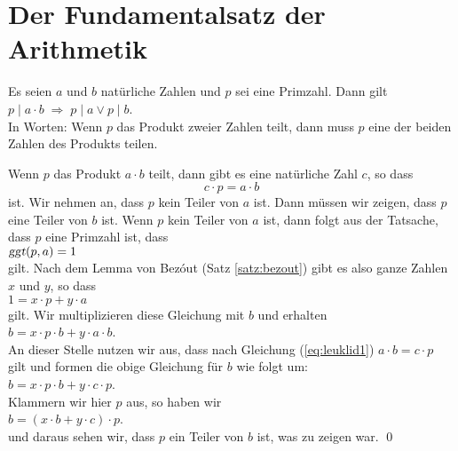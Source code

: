 \section{Der Fundamentalsatz der Arithmetik}
\begin{Satz} \lb
Es seien $a$ und $b$ natürliche Zahlen und $p$ sei eine Primzahl.  Dann gilt
\\[0.2cm]
\hspace*{1.3cm}
$p \mid a \cdot b \;\Rightarrow\; p \mid a  \vee p \mid b$.
\\[0.2cm]
In Worten: Wenn $p$ das Produkt zweier Zahlen teilt, dann muss $p$ eine der beiden Zahlen
des Produkts teilen.  
\end{Satz}

\proof
Wenn $p$ das Produkt $a \cdot b$ teilt, dann gibt es eine natürliche Zahl $c$, so dass
\begin{equation}
  \label{eq:leuklid1}
  c \cdot p = a \cdot b
\end{equation}
ist.  Wir nehmen an, dass $p$ kein Teiler von $a$ ist.  Dann müssen wir zeigen, dass $p$ eine
Teiler von $b$ ist.  Wenn $p$ kein Teiler von $a$ ist, dann folgt aus der Tatsache, dass
$p$ eine Primzahl ist, dass
\\[0.2cm]
\hspace*{1.3cm}
$\textsl{ggt}(p, a) = 1$
\\[0.2cm]
gilt.  Nach dem Lemma von Bez\'out (Satz \ref{satz:bezout}) gibt es also ganze Zahlen $x$
und $y$, so dass 
\\[0.2cm]
\hspace*{1.3cm}
$1 = x \cdot p + y \cdot a$
\\[0.2cm]
gilt.  Wir multiplizieren diese Gleichung mit $b$ und erhalten
\\[0.2cm]
\hspace*{1.3cm}
$b = x \cdot p \cdot b + y \cdot a \cdot b$.
\\[0.2cm]
An dieser Stelle nutzen wir aus, dass nach Gleichung (\ref{eq:leuklid1}) 
$a \cdot b = c \cdot p$ gilt und formen die obige Gleichung für $b$ wie folgt um:
\\[0.2cm]
\hspace*{1.3cm}
$b = x \cdot p \cdot b + y \cdot c \cdot p$.
\\[0.2cm]
Klammern wir hier $p$ aus, so haben wir
\\[0.2cm]
\hspace*{1.3cm}
$b = (x \cdot b + y \cdot c) \cdot p$.
\\[0.2cm]
und daraus sehen wir, dass $p$ ein Teiler von $b$ ist, was zu zeigen war. \qed
\vspace*{0.3cm}

